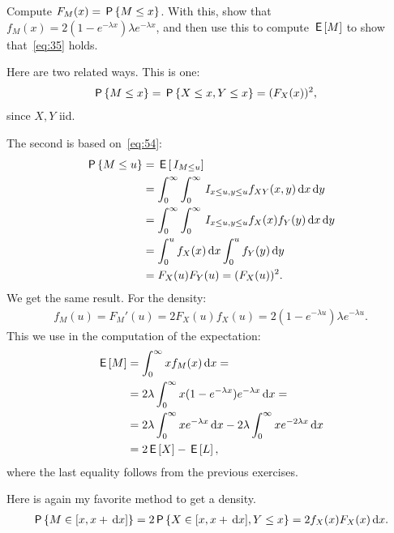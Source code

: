 \documentclass[a4paper,12pt]{article}
\begin{document}
\begin{exercise}\label{ex:6}
Compute $F_M(x) = \P{M\leq x}$. With this, show that  $f_{M}(x)=2(1-e^{-\lambda x}) \lambda e^{-\lambda x}$,  and then use this to compute $\E M$ to show that~\cref{eq:35} holds.
\begin{solution}
Here are two related ways. This is one:
\begin{align}
\P{M\leq x}   &= \P{X \leq x, Y \leq x} = (F_{X}(x))^{2},
\end{align}
since $X, Y$ iid.  

The second is based on~\cref{eq:54}:
\begin{align}
\P{M\leq u}   
&= \E{\1{M\leq u}} \\ 
&=\int_0^{\infty} \int_0^{\infty} \1{x\leq u, y\leq u} f_{XY}(x,y) \d x \d y \\
&= \int_0^{\infty} \int_0^{\infty} \1{x\leq u, y\leq u} f_{X}(x) f_{Y}(y) \d x \d y \\
&= \int_0^{u} f_{X}(x) \d x \int_0^{u}  f_{Y}(y)  \d y \\
&= F_{X}(u) F_Y(u) = (F_X(u))^2.
\end{align}
We get the same result.
For the density:
\begin{align}
  \label{eq:26}
  f_M(u) = F_M'(u) = 2 F_X(u) f_X(u) = 2(1-e^{-\lambda u}) \lambda e^{- \lambda u}.
\end{align}
This we use in the computation of the expectation:
\begin{align}
  \label{eq:27}
\E M 
&= \int_{0}^{\infty} x f_M(x) \d x = \\
&= 2 \lambda \int_{0}^{\infty} x (1-e^{-\lambda x}) e^{-\lambda x} \d x = \\
&= 2 \lambda \int_{0}^{\infty} x e^{-\lambda x} \d x -  2 \lambda \int_{0}^{\infty} x e^{-2 \lambda x} \d x \\
&= 2 \E X - \E L, 
\end{align}
where the last equality follows from the previous exercises. 

Here is again my favorite method to get a density.
\begin{align}
  \label{eq:28}
\P{M\in [x, x+\d x]}  = 2\P{X\in [x, x+\d x], Y\leq x} = 2 f_X(x) F_X(x)\d x.
\end{align}

\end{solution}
\end{exercise}
\end{document}
